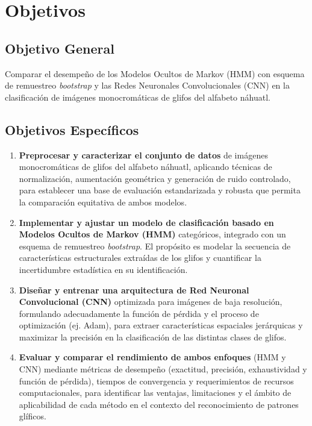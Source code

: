 \documentclass[
  spanish,
  us-letterpaper,
]{scrreprt}
\theoremstyle{definition}
\theoremstyle{remark}
\begin{document}

\chapter{Objetivos}\label{objetivos}

\section{Objetivo General}\label{objetivo-general}

Comparar el desempeño de los Modelos Ocultos de Markov (HMM) con esquema
de remuestreo \emph{bootstrap} y las Redes Neuronales Convolucionales
(CNN) en la clasificación de imágenes monocromáticas de glifos del
alfabeto náhuatl.

\section{Objetivos Específicos}\label{objetivos-especuxedficos}

\begin{enumerate}
\def\labelenumi{\arabic{enumi}.}
\item
  \textbf{Preprocesar y caracterizar el conjunto de datos} de imágenes
  monocromáticas de glifos del alfabeto náhuatl, aplicando técnicas de
  normalización, aumentación geométrica y generación de ruido
  controlado, para establecer una base de evaluación estandarizada y
  robusta que permita la comparación equitativa de ambos modelos.
\item
  \textbf{Implementar y ajustar un modelo de clasificación basado en
  Modelos Ocultos de Markov (HMM)} categóricos, integrado con un esquema
  de remuestreo \emph{bootstrap}. El propósito es modelar la secuencia
  de características estructurales extraídas de los glifos y cuantificar
  la incertidumbre estadística en su identificación.
\item
  \textbf{Diseñar y entrenar una arquitectura de Red Neuronal
  Convolucional (CNN)} optimizada para imágenes de baja resolución,
  formulando adecuadamente la función de pérdida y el proceso de
  optimización (ej. Adam), para extraer características espaciales
  jerárquicas y maximizar la precisión en la clasificación de las
  distintas clases de glifos.
\item
  \textbf{Evaluar y comparar el rendimiento de ambos enfoques} (HMM y
  CNN) mediante métricas de desempeño (exactitud, precisión,
  exhaustividad y función de pérdida), tiempos de convergencia y
  requerimientos de recursos computacionales, para identificar las
  ventajas, limitaciones y el ámbito de aplicabilidad de cada método en
  el contexto del reconocimiento de patrones glíficos.
\end{enumerate}
\end{document}
